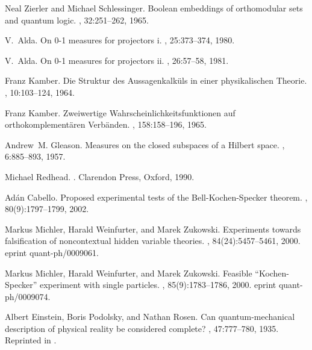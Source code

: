 \documentclass{epl}
\begin{document}
\begin{thebibliography}{10}
Neal Zierler and Michael Schlessinger.
\newblock Boolean embeddings of orthomodular sets and quantum logic.
, 32:251--262, 1965.

V.~Alda.
\newblock On\/ {\rm 0-1} measures for projectors i.
, 25:373--374, 1980.

V.~Alda.
\newblock On\/ {\rm 0-1} measures for projectors ii.
, 26:57--58, 1981.

Franz Kamber.
\newblock Die {S}truktur des {A}ussagenkalk{\"{u}}ls in einer physikalischen
  {T}heorie.
, 10:103--124, 1964.

Franz Kamber.
\newblock Zweiwertige {W}ahrscheinlichkeitsfunktionen auf
  orthokomplement{\"{a}}ren {V}erb{\"{a}}nden.
, 158:158--196, 1965.

Andrew~M. Gleason.
\newblock Measures on the closed subspaces of a {H}ilbert space.
, 6:885--893, 1957.

Michael Redhead.
.
\newblock Clarendon Press, Oxford, 1990.

Ad{\'{a}}n Cabello.
\newblock Proposed experimental tests of the {B}ell-{K}ochen-{S}pecker theorem.
, 80(9):1797--1799, 2002.

Markus Michler, Harald Weinfurter, and Marek Zukowski.
\newblock Experiments towards falsification of noncontextual hidden variable
  theories.
, 84(24):5457--5461, 2000.
\newblock eprint quant-ph/0009061.

Markus Michler, Harald Weinfurter, and Marek Zukowski.
\newblock Feasible ``{K}ochen-{S}pecker'' experiment with single particles.
, 85(9):1783--1786, 2000.
\newblock eprint quant-ph/0009074.

Albert Einstein, Boris Podolsky, and Nathan Rosen.
\newblock Can quantum-mechanical description of physical reality be considered
  complete?
, 47:777--780, 1935.
\newblock Reprinted in \cite[pages. 138-141]{wheeler-Zurek:83}.


\end{thebibliography}
\end{document}
